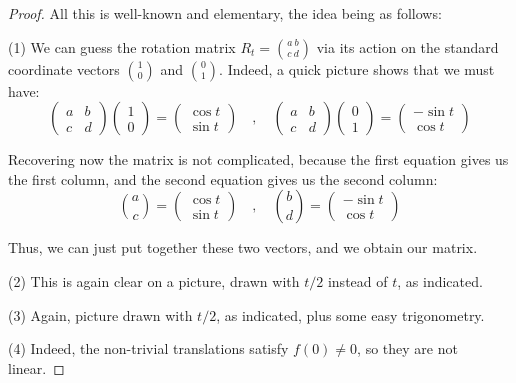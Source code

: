 \documentclass[12pt]{amsbook}
\begin{document}
\begin{proof}
All this is well-known and elementary, the idea being as follows:

\medskip

(1) We can guess the rotation matrix $R_t=\binom{a\ b}{c\ d}$ via its action on the standard coordinate vectors $\binom{1}{0}$ and $\binom{0}{1}$. Indeed, a quick picture shows that we must have:
$$\begin{pmatrix}a&b\\ c&d\end{pmatrix}\begin{pmatrix}1\\ 0\end{pmatrix}=
\begin{pmatrix}\cos t\\ \sin t\end{pmatrix}\quad,\quad 
\begin{pmatrix}a&b\\ c&d\end{pmatrix}\begin{pmatrix}0\\ 1\end{pmatrix}=
\begin{pmatrix}-\sin t\\ \cos t\end{pmatrix}$$

Recovering now the matrix is not complicated, because the first equation gives us the first column, and the second equation gives us the second column:
$$\binom{a}{c}=\begin{pmatrix}\cos t\\ \sin t\end{pmatrix}\quad,\quad 
\binom{b}{d}=\begin{pmatrix}-\sin t\\ \cos t\end{pmatrix}$$

Thus, we can just put together these two vectors, and we obtain our matrix.

\medskip

(2) This is again clear on a picture, drawn with $t/2$ instead of $t$, as indicated.

\medskip

(3) Again, picture drawn with $t/2$, as indicated, plus some easy trigonometry.

\medskip

(4) Indeed, the non-trivial translations satisfy $f(0)\neq0$, so they are not linear.
\end{proof}
\end{document}
